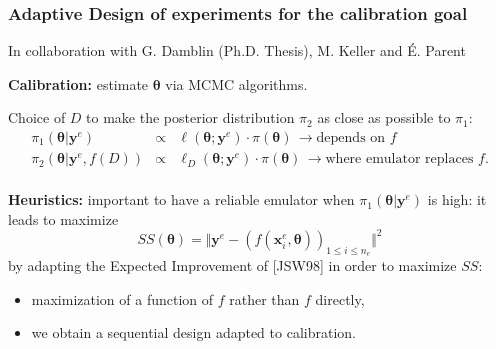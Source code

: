 \documentclass[nopagenumber,9pt]{beamer}
\newcommand{\E}{\mathbb{E}}
\newcommand{\btheta}{\boldsymbol{\theta}}
\newcommand{\by}{\mathbf{y}}
\newcommand{\bx}{\mathbf{x}}
\newcommand{\bxf}{\bx^e}
\newcommand{\nf}{n_e}
\newcommand{\byf}{\by^e}
\newcommand{\citemano}[1]{\textcolor{dgreen}{#1}}
\begin{document}
\begin{frame}
 \frametitle{Adaptive Design of experiments for the calibration goal}
 In collaboration with G. Damblin (Ph.D. Thesis), M. Keller and É. Parent \cite{barbillondamblin} 
 

 \bigskip
\textbf{Calibration:} estimate $\btheta$ via MCMC algorithms.
 
 \smallskip
 Choice of $D$ to make the posterior distribution $\pi_2$ as close as possible to $\pi_1$: 
 \begin{eqnarray*}
 \pi_1(\btheta|\byf)&\propto& \ell(\btheta;\byf) \cdot\pi(\btheta)\, \rightarrow \text{depends on }f\\
 \pi_2(\btheta|\byf,f(D))&\propto& \ell_D(\btheta;\byf)\cdot\pi(\btheta)\, \rightarrow \text{where emulator replaces } f.\\
\end{eqnarray*}
 
 
 \medskip
 \textbf{Heuristics:} important to have a reliable emulator when $\pi_1(\btheta|\byf)$ is high:
 it leads to maximize 
 $$SS(\btheta)=\Vert \byf-(f(\bxf_i,\btheta))_{1\le i\le \nf} \Vert^2$$
 by adapting the Expected Improvement of \citemano{[JSW98]} in order to maximize $SS$:

\smallskip
\begin{itemize}
 \item maximization of a function of $f$ rather than $f$ directly,
 \smallskip
 \item we obtain a sequential design adapted to calibration.
\end{itemize}


\end{frame}
\end{document}
